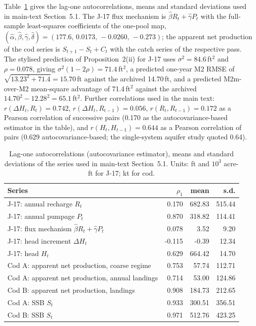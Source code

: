 \documentclass[preprint,11pt,authoryear]{elsarticle}
\theoremstyle{remark}
\begin{document}
Table~\ref{tab:si_autocorr} gives the lag-one autocorrelations, means and standard deviations used in main-text Section~5.1. The J-17 flux mechanism is $\hat\beta R_t+\hat\gamma P_t$ with the full-sample least-squares coefficients of the one-pool map, $(\hat\alpha,\hat\beta,\hat\gamma,\hat\delta)=(177.6,\,0.0173,\,-0.0260,\,-0.273)$; the apparent net production of the cod series is $S_{t+1}-S_t+C_t$ with the catch series of the respective pass. The stylised prediction of Proposition~2(ii) for J-17 uses $\sigma^2=84.6$\,ft$^2$ and $\rho=0.078$, giving $\sigma^2(1-2\rho)=71.4$\,ft$^2$, a predicted one-year M2 RMSE of $\sqrt{13.23^2+71.4}=15.70$\,ft against the archived 14.70\,ft, and a predicted M2m-over-M2 mean-square advantage of 71.4\,ft$^2$ against the archived $14.70^2-12.28^2=65.1$\,ft$^2$. Further correlations used in the main text: $r(\Delta H_t,R_t)=0.742$, $r(\Delta H_t,R_{t-1})=0.056$, $r(R_t,R_{t-1})=0.172$ as a Pearson correlation of successive pairs (0.170 as the autocovariance-based estimator in the table), and $r(H_t,H_{t-1})=0.644$ as a Pearson correlation of pairs (0.629 autocovariance-based; the single-system aquifer study quoted 0.64).

\begin{table}[!htb]
\centering\footnotesize\setlength{\tabcolsep}{3.5pt}
\caption{Lag-one autocorrelations (autocovariance estimator), means and standard deviations of the series used in main-text Section~5.1. Units: ft and $10^3$ acre-ft for J-17; kt for cod.}
\label{tab:si_autocorr}
\begin{tabular}{@{}lrrr@{}}
\toprule
Series & $\rho_1$ & mean & s.d. \\
\midrule
J-17: annual recharge $R_t$ & 0.170 & 682.83 & 515.44 \\
J-17: annual pumpage $P_t$ & 0.870 & 318.82 & 114.41 \\
J-17: flux mechanism $\hat\beta R_t+\hat\gamma P_t$ & 0.078 & 3.52 & 9.20 \\
J-17: head increment $\Delta H_t$ & -0.115 & -0.39 & 12.34 \\
J-17: head $H_t$ & 0.629 & 664.42 & 14.70 \\
Cod A: apparent net production, coarse regime & 0.753 & 57.74 & 112.71 \\
Cod A: apparent net production, annual landings & 0.714 & 53.00 & 124.86 \\
Cod B: apparent net production, landings & 0.908 & 184.73 & 212.65 \\
Cod A: SSB $S_t$ & 0.933 & 300.51 & 356.51 \\
Cod B: SSB $S_t$ & 0.971 & 512.76 & 423.25 \\
\bottomrule
\end{tabular}
\end{table}
\end{document}
